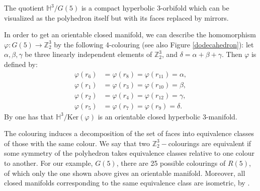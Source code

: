 \documentclass[12pt]{article}
\newcommand{\1}{\mathds{1}}
\begin{document}
The quotient $\mathbb{H}^3/G(5)$ is a compact hyperbolic 3-orbifold which can be visualized as the polyhedron itself but with its faces replaced by mirrors. 

In order to get an orientable closed manifold, we can describe the homomorphism $\varphi: G(5) \rightarrow \mathbb{Z}_2^3$ by the following 4-colouring (see also Figure \ref{dodecahedron}): let $\alpha, \beta, \gamma$ be three linearly independent elements of $\mathbb{Z}_2^3$, and $\delta = \alpha + \beta + \gamma$. Then $\varphi$ is defined by:
\[
\begin{aligned}
\varphi(r_{6})  &= \varphi(r_{8})  = \varphi(r_{11}) = \alpha,\\
\varphi(r_{1})  &= \varphi(r_{3})  = \varphi(r_{10}) = \beta,\\
\varphi(r_{2})  &= \varphi(r_{4})  = \varphi(r_{12}) = \gamma,\\
\varphi(r_{5})  &= \varphi(r_{7})  = \varphi(r_{9})  = \delta.
\end{aligned}
\]
By \cite[Theorem 1]{Vesnin} one has that $\mathbb{H}^3/\text{Ker}(\varphi)$ is an orientable closed hyperbolic 3-manifold. 

The colouring induces a decomposition of the set of faces into equivalence classes of those with the same colour. We say that two $\mathbb{Z}_2^3-$colourings are equivalent if some symmetry of the polyhedron takes equivalence classes relative to one colour to another. For our example, $G(5)$, there are 25 possible colourings of $R(5)$, of which only the one shown above gives an orientable manifold. Moreover, all closed manifolds corresponding to the same equivalence class are isometric, by \cite[Theorem 3.3]{Garrison-Scott}.
\end{document}
